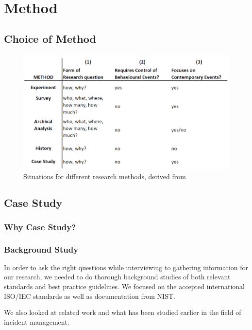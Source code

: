 \chapter{Method}
\section{Choice of Method}
\begin{figure}[h]
\begin{center}
\includegraphics[scale=0.35]{methods.png}
\caption[Situations for different research methods]{Situations for different research methods, derived from \cite{CaseStudyResearch}}
\label{fig:methods}
\end{center}
\end{figure}
\section{Case Study}
\subsection{Why Case Study?}

\subsection{Background Study}
In order to ask the right questions while interviewing to gathering information for our research, we needed to do thorough background studies of both relevant standards and best practice guidelines. We focused on the accepted international ISO/IEC standards as well as documentation from \ac{NIST}.

We also looked at related work and what has been studied earlier in the field of incident management. 

